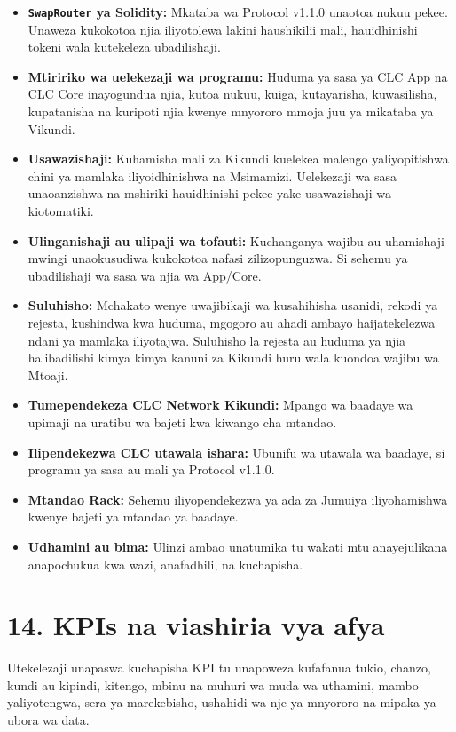 \documentclass[11pt]{article}
\begin{document}
\begin{itemize}[leftmargin=*]
\item \textbf{\texttt{SwapRouter} ya Solidity:} Mkataba wa Protocol v1.1.0 unaotoa nukuu pekee. Unaweza kukokotoa njia iliyotolewa lakini haushikilii mali, hauidhinishi tokeni wala kutekeleza ubadilishaji.
\item \textbf{Mtiririko wa uelekezaji wa programu:} Huduma ya sasa ya CLC App na CLC Core inayogundua njia, kutoa nukuu, kuiga, kutayarisha, kuwasilisha, kupatanisha na kuripoti njia kwenye mnyororo mmoja juu ya mikataba ya Vikundi.
\item \textbf{Usawazishaji:} Kuhamisha mali za Kikundi kuelekea malengo yaliyopitishwa chini ya mamlaka iliyoidhinishwa na Msimamizi. Uelekezaji wa sasa unaoanzishwa na mshiriki hauidhinishi pekee yake usawazishaji wa kiotomatiki.
\item \textbf{Ulinganishaji au ulipaji wa tofauti:} Kuchanganya wajibu au uhamishaji mwingi unaokusudiwa kukokotoa nafasi zilizopunguzwa. Si sehemu ya ubadilishaji wa sasa wa njia wa App/Core.
\item \textbf{Suluhisho:} Mchakato wenye uwajibikaji wa kusahihisha usanidi, rekodi ya rejesta, kushindwa kwa huduma, mgogoro au ahadi ambayo haijatekelezwa ndani ya mamlaka iliyotajwa. Suluhisho la rejesta au huduma ya njia halibadilishi kimya kimya kanuni za Kikundi huru wala kuondoa wajibu wa Mtoaji.
\item \textbf{Tumependekeza CLC Network Kikundi:} Mpango wa baadaye wa upimaji na uratibu wa bajeti kwa kiwango cha mtandao.
\item \textbf{Ilipendekezwa CLC utawala ishara:} Ubunifu wa utawala wa baadaye, si programu ya sasa au mali ya Protocol v1.1.0.
\item \textbf{Mtandao Rack:} Sehemu iliyopendekezwa ya ada za Jumuiya iliyohamishwa kwenye bajeti ya mtandao ya baadaye.
\item \textbf{Udhamini au bima:} Ulinzi ambao unatumika tu wakati mtu anayejulikana anapochukua kwa wazi, anafadhili, na kuchapisha.
\end{itemize}

\section*{14. KPIs na viashiria vya afya}

Utekelezaji unapaswa kuchapisha KPI tu unapoweza kufafanua tukio, chanzo, kundi au kipindi, kitengo, mbinu na muhuri wa muda wa uthamini, mambo yaliyotengwa, sera ya marekebisho, ushahidi wa nje ya mnyororo na mipaka ya ubora wa data.
\end{document}
